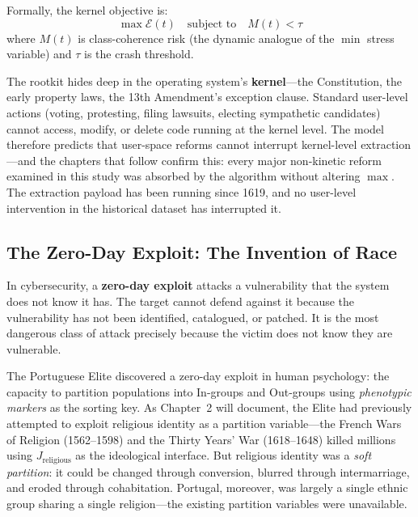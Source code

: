 \documentclass[12pt,openany]{book}
\begin{document}
Formally, the kernel objective is:
\[
\max \mathcal{E}(t) \quad \text{subject to} \quad M(t) < \tau
\]
where $M(t)$ is class-coherence risk (the dynamic analogue of the $\min$ stress variable) and $\tau$ is the crash threshold.

The rootkit hides deep in the operating system's \textbf{kernel}---the Constitution, the early property laws, the 13th Amendment's exception clause. Standard user-level actions (voting, protesting, filing lawsuits, electing sympathetic candidates) cannot access, modify, or delete code running at the kernel level. The model therefore predicts that user-space reforms cannot interrupt kernel-level extraction---and the chapters that follow confirm this: every major non-kinetic reform examined in this study was absorbed by the algorithm without altering $\max$. The extraction payload has been running since 1619, and no user-level intervention in the historical dataset has interrupted it.

\subsection{The Zero-Day Exploit: The Invention of Race}

In cybersecurity, a \textbf{zero-day exploit} attacks a vulnerability that the system does not know it has. The target cannot defend against it because the vulnerability has not been identified, catalogued, or patched. It is the most dangerous class of attack precisely because the victim does not know they are vulnerable.

The Portuguese Elite discovered a zero-day exploit in human psychology: the capacity to partition populations into In-groups and Out-groups using \textit{phenotypic markers} as the sorting key. As Chapter~2 will document, the Elite had previously attempted to exploit religious identity as a partition variable---the French Wars of Religion (1562--1598) and the Thirty Years' War (1618--1648) killed millions using $J_{\text{religious}}$ as the ideological interface. But religious identity was a \textit{soft partition}: it could be changed through conversion, blurred through intermarriage, and eroded through cohabitation. Portugal, moreover, was largely a single ethnic group sharing a single religion---the existing partition variables were unavailable.
\end{document}
